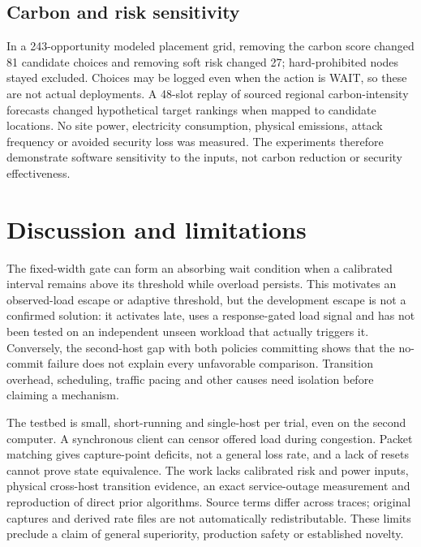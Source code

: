 \documentclass[11pt]{article}
\begin{document}
\subsection{Carbon and risk sensitivity}
In a 243-opportunity modeled placement grid, removing the carbon score changed 81 candidate choices and removing soft risk changed 27; hard-prohibited nodes stayed excluded. Choices may be logged even when the action is WAIT, so these are not actual deployments. A 48-slot replay of sourced regional carbon-intensity forecasts changed hypothetical target rankings when mapped to candidate locations. No site power, electricity consumption, physical emissions, attack frequency or avoided security loss was measured. The experiments therefore demonstrate software sensitivity to the inputs, not carbon reduction or security effectiveness.

\section{Discussion and limitations}
The fixed-width gate can form an absorbing wait condition when a calibrated interval remains above its threshold while overload persists. This motivates an observed-load escape or adaptive threshold, but the development escape is not a confirmed solution: it activates late, uses a response-gated load signal and has not been tested on an independent unseen workload that actually triggers it. Conversely, the second-host gap with both policies committing shows that the no-commit failure does not explain every unfavorable comparison. Transition overhead, scheduling, traffic pacing and other causes need isolation before claiming a mechanism.

The testbed is small, short-running and single-host per trial, even on the second computer. A synchronous client can censor offered load during congestion. Packet matching gives capture-point deficits, not a general loss rate, and a lack of resets cannot prove state equivalence. The work lacks calibrated risk and power inputs, physical cross-host transition evidence, an exact service-outage measurement and reproduction of direct prior algorithms. Source terms differ across traces; original captures and derived rate files are not automatically redistributable. These limits preclude a claim of general superiority, production safety or established novelty.
\end{document}
